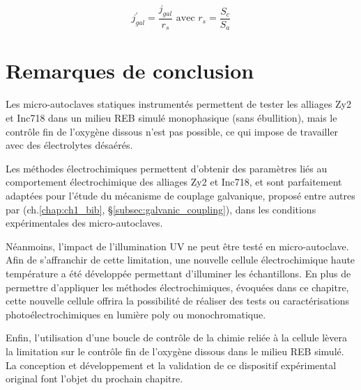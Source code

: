 \begin{refsection}
    \begin{equation}
        j_{gal}^{\prime} = \frac{j_{gal}}{r_s} \text{ avec } r_s = \frac{S_c}{S_a}
    \label{eq:ch2_jgalvanic_correction}
    \end{equation}


    
    

    
    


\section{Remarques de conclusion}

    Les micro-autoclaves statiques instrumentés permettent de tester les alliages Zy2 et Inc718 dans un milieu REB
    simulé 
    monophasique (sans ébullition), mais le contrôle fin de l'oxygène dissous n'est pas possible, ce qui impose de
    travailler avec des électrolytes désaérés. 

    Les méthodes électrochimiques permettent d'obtenir des paramètres liés au comportement électrochimique des alliages
    Zy2 et Inc718, et sont parfaitement adaptées pour l'étude du mécanisme de couplage galvanique, proposé
    entre autres par
    \citet{Lysell2004} (ch.\ref{chap:ch1_bib}, \S\ref{subsec:galvanic_coupling}), dans les conditions expérimentales des
    micro-autoclaves.

    Néanmoins, l'impact de l'illumination UV ne peut être testé en micro-autoclave. Afin de s'affranchir de cette
    limitation, une nouvelle cellule électrochimique haute température a été développée permettant d'illuminer les échantillons. 
    En plus de permettre
    d'appliquer les méthodes électrochimiques, évoquées dans ce chapitre, cette nouvelle cellule offrira la possibilité de
    réaliser des tests ou caractérisations photoélectrochimiques en lumière poly ou monochromatique.
    
    Enfin, l'utilisation d'une boucle de contrôle de la chimie reliée à la cellule lèvera
    la limitation sur le contrôle fin de l'oxygène dissous dans le milieu REB simulé.
    La conception et développement et la validation de ce dispositif expérimental original font l'objet du prochain
    chapitre.
    \singlespacing
\printbibliography[heading=subbibintoc]
    \onehalfspacing
\end{refsection}
